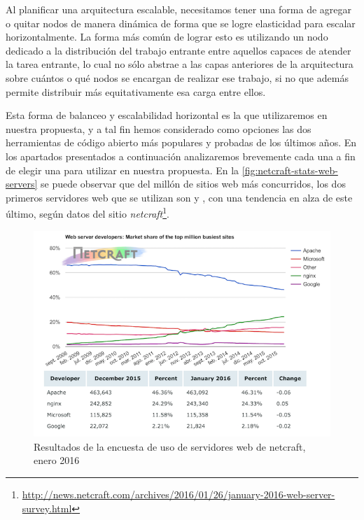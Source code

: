 Al planificar una arquitectura escalable, necesitamos tener una forma de agregar o quitar nodos de manera dinámica de forma que se logre elasticidad para escalar horizontalmente. La forma más común de lograr esto es utilizando un nodo dedicado a la distribución del trabajo entrante entre aquellos capaces de atender la tarea entrante, lo cual no sólo abstrae a las capas anteriores de la arquitectura sobre cuántos o qué nodos se encargan de realizar ese trabajo, si no que además permite distribuir más equitativamente esa carga entre ellos.

Esta forma de balanceo y escalabilidad horizontal es la que utilizaremos en nuestra propuesta, y a tal fin hemos considerado como opciones las dos herramientas de código abierto más populares y probadas de los últimos años. En los apartados presentados a continuación analizaremos brevemente cada una a fin de elegir una para utilizar en nuestra propuesta. En la \autoref{fig:netcraft-stats-web-servers} se puede observar que del millón de sitios web más concurridos, los dos primeros servidores web que se utilizan son  y , con una tendencia en alza de este último, según datos del sitio \textit{netcraft}\footnote{\url{http://news.netcraft.com/archives/2016/01/26/january-2016-web-server-survey.html}}.

\begin{figure}[H]
  \includegraphics[width=\linewidth]{src/images/03-capitulo-3/tecnologias/balanceo/stats.png}
  \caption{Resultados de la encuesta de uso de servidores web de netcraft, enero 2016}
  \label{fig:netcraft-stats-web-servers}
\end{figure}
